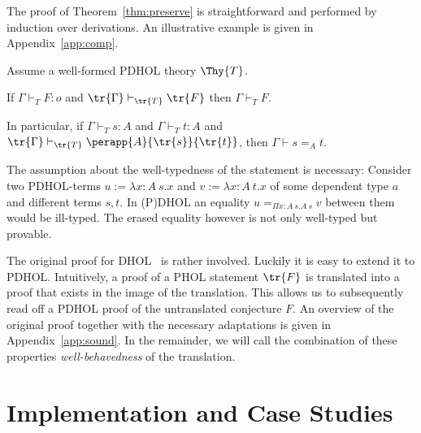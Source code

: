 The proof of Theorem~\ref{thm:preserve} is straightforward and performed by induction over
derivations. An illustrative example is given in Appendix~\ref{app:comp}.


\begin{theorem}\label{thm:sound}
Assume a well-formed PDHOL theory \(\Thy{T}\). 
\begin{center}
    If \(\Gamma \vdash_T F:o\) and \(\tr{\Gamma} \vdash_{\tr{T}} \tr{F}\) then \(\Gamma\vdash_T F\).
\end{center}
In particular, if \(\Gamma \vdash_T s:A\) and \(\Gamma \vdash_T t:A\) and \(\tr{\Gamma} \vdash_{\tr{T}} \perapp{A}{\tr{s}}{\tr{t}}\), then \(\Gamma \vdash s =_A t\).
\end{theorem}


The assumption about the well-typedness of the statement is necessary: Consider two
PDHOL-terms \(u := \lambda x:A\ s.x\) and \(v := \lambda x:A\ t.x\) of some dependent type
\(a\) and different terms \(s, t\). In (P)DHOL an equality \(u =_{\Pi x:A\ s.A\ s} v\) between
them would be ill-typed. The erased equality however is not only well-typed but provable.

    The original proof for DHOL~\cite{RRB23ext} is rather involved.
    Luckily it is easy to extend it to PDHOL.
    Intuitively, a proof of a PHOL statement \(\tr{F}\) is translated into a proof that exists in the image of the translation.
    This allows us to subsequently read off a PDHOL proof of the untranslated conjecture
    \(F\). An overview of the original proof together with the necessary adaptations is given
    in Appendix~\ref{app:sound}.
In the remainder, we will call the combination of these properties \emph{well-behavedness} of
the translation.

\section{Implementation and Case Studies}\label{sec:case}


